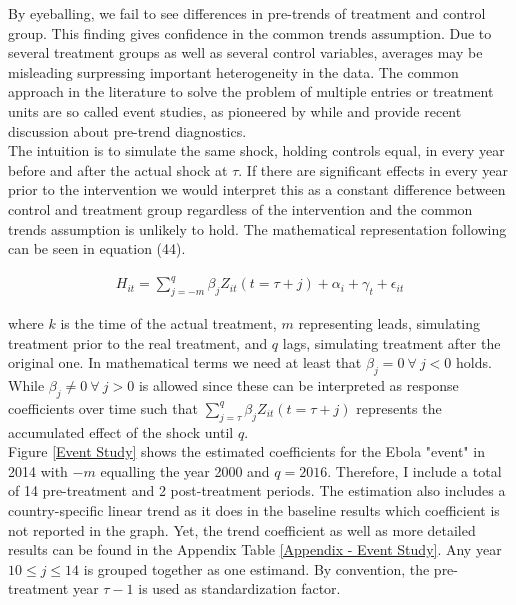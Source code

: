 \documentclass{article}
\begin{document}
By eyeballing, we fail to see differences in pre-trends of treatment and control group. This finding gives confidence in the common trends assumption. Due to several treatment groups as well as several control variables, averages may be misleading surpressing important heterogeneity in the data. The common approach in the literature to solve the problem of multiple entries or treatment units are so called event studies, as pioneered by \cite{bertrand2004much} while \cite{freyal2018pre} and
\cite{borusyak2017revisiting} provide recent discussion about pre-trend diagnostics. \\
The intuition is to simulate the same shock, holding controls equal, in every year before and after the actual shock at $\tau$. If there are significant effects in every year prior to the intervention we would interpret this as a constant difference between control and treatment group regardless of the intervention and the common trends assumption is unlikely to hold. The mathematical representation following \cite{pischke2005empirical} can be seen in equation (44).

\begin{align}
H_{it} =  \sum_{j=-m}^q \beta_j Z_{it}(t = \tau + j) + \alpha_i + \gamma_t + \epsilon_{it}
\end{align}

where $k$ is the time of the actual treatment, $m$ representing leads, simulating treatment prior to the real treatment, and $q$ lags, simulating treatment after the original one. In mathematical terms we need at least that $\beta_j = 0 \ \forall \ j < 0$ holds. While $\beta_j \neq 0 \ \forall \ j > 0$ is allowed since these can be interpreted as response coefficients over time such that $\sum_{j= \tau}^q \beta_j Z_{it}(t = \tau + j)$ represents the accumulated effect of the shock until $q$. \\
Figure \ref{Event Study} shows the estimated coefficients for the Ebola "event" in 2014 with $-m$ equalling the year 2000 and $q = 2016$. Therefore, I include a total of 14 pre-treatment and 2 post-treatment periods. The estimation also includes a country-specific linear trend as it does in the baseline results which coefficient is not reported in the graph. Yet, the trend coefficient as well as more detailed results can be found in the Appendix Table \ref{Appendix - Event Study}. Any year $10 \leqslant j \leqslant 14 $ is grouped together as one estimand. By convention, the pre-treatment year $\tau - 1$ is used as standardization factor.
\end{document}

